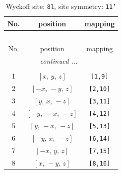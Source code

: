 \documentclass[fleqn,8pt]{jsarticle}
\begin{document}
\renewcommand{\arraystretch}{1.2}
\begin{longtable}{ccc}
\caption{Wyckoff site: {\tt 8l}, site symmetry: {\tt 11'}}
 \\
 \hline \hline
No. & position & mapping \\ \hline \endfirsthead

\multicolumn{2}{l}{\tablename\ \thetable{}} \\
 \hline \hline
No. & position & mapping \\ \hline \endhead

 \hline \hline
\multicolumn{2}{r}{\footnotesize\it continued ...} \\ \endfoot

 \hline \hline
\multicolumn{2}{r}{} \\ \endlastfoot

1 & $\left[ x,\, y,\, z \right]$ & {\tt [1,9]} \\ \hline
2 & $\left[ - x,\, - y,\, z \right]$ & {\tt [2,10]} \\ \hline
3 & $\left[ y,\, x,\, - z \right]$ & {\tt [3,11]} \\ \hline
4 & $\left[ - y,\, - x,\, - z \right]$ & {\tt [4,12]} \\ \hline
5 & $\left[ y,\, - x,\, - z \right]$ & {\tt [5,13]} \\ \hline
6 & $\left[ - y,\, x,\, - z \right]$ & {\tt [6,14]} \\ \hline
7 & $\left[ - x,\, y,\, z \right]$ & {\tt [7,15]} \\ \hline
8 & $\left[ x,\, - y,\, z \right]$ & {\tt [8,16]} \\
\end{longtable}
\end{document}
